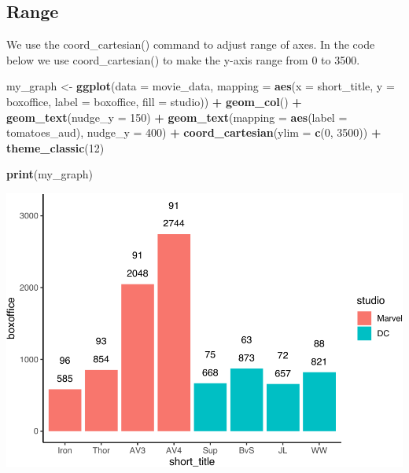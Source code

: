 \documentclass[
]{krantz}
\makeatletter
\newenvironment{Shaded}{\begin{snugshade}}{\end{snugshade}}
\newcommand{\DataTypeTok}[1]{\textcolor[rgb]{0.27,0.27,0.27}{#1}}
\newcommand{\DecValTok}[1]{\textcolor[rgb]{0.06,0.06,0.06}{#1}}
\newcommand{\KeywordTok}[1]{\textcolor[rgb]{0.27,0.27,0.27}{\textbf{#1}}}
\newcommand{\NormalTok}[1]{#1}
\newcommand{\OperatorTok}[1]{\textcolor[rgb]{0.43,0.43,0.43}{\textbf{#1}}}
\newcommand{\StringTok}[1]{\textcolor[rgb]{0.5,0.5,0.5}{#1}}
\newenvironment{kframe}{%
\medskip{}
\setlength{\fboxsep}{.8em}
 \def\at@end@of@kframe{}%
 \ifinner\ifhmode%
  \def\at@end@of@kframe{\end{minipage}}%
  \begin{minipage}{\columnwidth}%
 \fi\fi%
 \def\FrameCommand##1{\hskip\@totalleftmargin \hskip-\fboxsep
 \colorbox{shadecolor}{##1}\hskip-\fboxsep
     \hskip-\linewidth \hskip-\@totalleftmargin \hskip\columnwidth}%
 \MakeFramed {\advance\hsize-\width
   \@totalleftmargin\z@ \linewidth\hsize
   \@setminipage}}%
 {\par\unskip\endMakeFramed%
 \at@end@of@kframe}
\renewenvironment{Shaded}{\begin{kframe}}{\end{kframe}}
\makeatother
\begin{document}
\hypertarget{range}{%
\subsection{Range}\label{range}}

We use the coord\_cartesian() command to adjust range of axes. In the code below we use coord\_cartesian() to make the y-axis range from 0 to 3500.

\begin{Shaded}
\begin{Highlighting}[]
\NormalTok{my_graph <-}\StringTok{ }\KeywordTok{ggplot}\NormalTok{(}\DataTypeTok{data =}\NormalTok{ movie_data,}
           \DataTypeTok{mapping =} \KeywordTok{aes}\NormalTok{(}\DataTypeTok{x =}\NormalTok{ short_title,}
                         \DataTypeTok{y =}\NormalTok{ boxoffice,}
                         \DataTypeTok{label =}\NormalTok{ boxoffice, }
                         \DataTypeTok{fill =}\NormalTok{ studio)) }\OperatorTok{+}
\StringTok{  }\KeywordTok{geom_col}\NormalTok{() }\OperatorTok{+}
\StringTok{  }\KeywordTok{geom_text}\NormalTok{(}\DataTypeTok{nudge_y =} \DecValTok{150}\NormalTok{)  }\OperatorTok{+}
\StringTok{  }\KeywordTok{geom_text}\NormalTok{(}\DataTypeTok{mapping =} \KeywordTok{aes}\NormalTok{(}\DataTypeTok{label =}\NormalTok{ tomatoes_aud), }
            \DataTypeTok{nudge_y =} \DecValTok{400}\NormalTok{) }\OperatorTok{+}
\StringTok{  }\KeywordTok{coord_cartesian}\NormalTok{(}\DataTypeTok{ylim =} \KeywordTok{c}\NormalTok{(}\DecValTok{0}\NormalTok{, }\DecValTok{3500}\NormalTok{)) }\OperatorTok{+}
\StringTok{  }\KeywordTok{theme_classic}\NormalTok{(}\DecValTok{12}\NormalTok{)}


\KeywordTok{print}\NormalTok{(my_graph)}
\end{Highlighting}
\end{Shaded}

\includegraphics{bookdown_files/figure-latex/unnamed-chunk-247-1.pdf}
\end{document}
